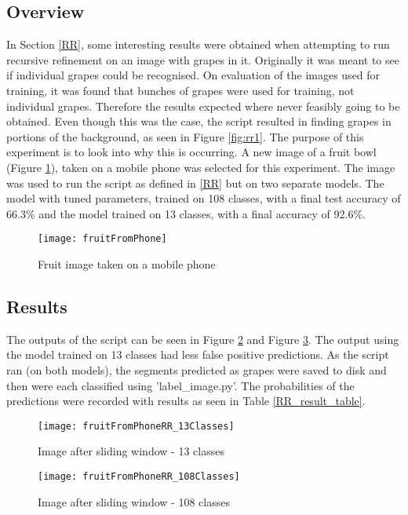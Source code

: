 \subsection*{Overview}
In Section \ref{RR}, some interesting results were obtained when attempting to run recursive refinement on an image with grapes in it.
Originally it was meant to see if individual grapes could be recognised.
On evaluation of the images used for training, it was found that bunches of grapes were used for training, not individual grapes. Therefore the results expected where never feasibly going to be obtained.
Even though this was the case, the script resulted in finding grapes in portions of the background, as seen in Figure \ref{fig:rr1}.
The purpose of this experiment is to look into why this is occurring.
A new image of a fruit bowl (Figure \ref{fig:fruitFromPhone}), taken on a mobile phone was selected for this experiment.
The image was used to run the script as defined in \ref{RR} but on two separate models.
The model with tuned parameters, trained on 108 classes, with a final test accuracy of 66.3\% and the model trained on 13 classes, with a final accuracy of 92.6\%.

\begin{figure}[h]
\centering
    \texttt{[image: fruitFromPhone]}
      \caption{Fruit image taken on a mobile phone}
      \label{fig:fruitFromPhone}
\end{figure}

\subsection*{Results}
The outputs of the script can be seen in Figure \ref{fig:fruitRR13} and Figure \ref{fig:fruitRR108}. The output using the model trained on 13 classes had less false positive predictions. As the script ran (on both models), the segments predicted as grapes were saved to disk and then were each classified using 'label\_image.py'. The probabilities of the predictions were recorded with results as seen in Table \ref{RR_result_table}.

\begin{figure}[h]
\centering
    \texttt{[image: fruitFromPhoneRR\_13Classes]}
      \caption{Image after sliding window - 13 classes}
      \label{fig:fruitRR13}
\end{figure}

\begin{figure}[h]
	\centering
    \texttt{[image: fruitFromPhoneRR\_108Classes]}
      \caption{Image after sliding window - 108 classes}
      \label{fig:fruitRR108}
\end{figure}

